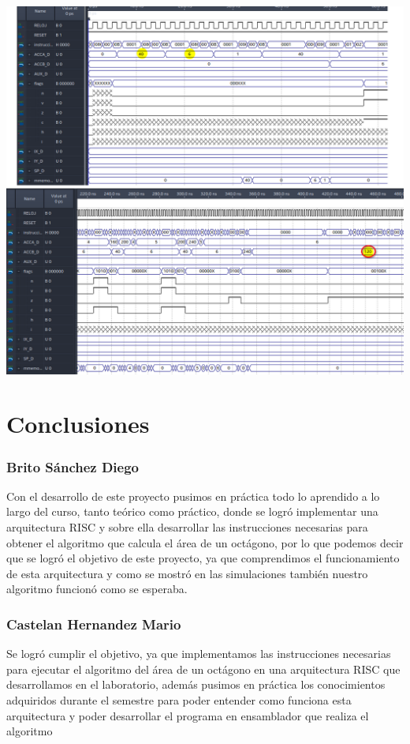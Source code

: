 \documentclass{IEEEtran}
\begin{document}
\begin{center}
\includegraphics[width=.9\linewidth]{./img/40x6.png}
\end{center}
\section{Conclusiones}
\label{sec:org841a61c}
\subsubsection{Brito Sánchez Diego}
\label{sec:orgc0e360c}
Con el desarrollo de este proyecto pusimos en práctica todo lo aprendido a lo largo del curso, tanto teórico como práctico, donde se logró implementar una arquitectura RISC y sobre ella desarrollar las instrucciones necesarias para obtener el algoritmo que calcula el área de un octágono, por lo que podemos decir que se logró el objetivo de este proyecto, ya que comprendimos el funcionamiento de esta arquitectura y como se mostró en las simulaciones también nuestro algoritmo funcionó como se esperaba.

\subsubsection{Castelan Hernandez Mario}
\label{sec:org73439e4}
Se logró cumplir el objetivo, ya que implementamos las instrucciones necesarias para ejecutar el algoritmo del área de un octágono en una arquitectura RISC que desarrollamos en el laboratorio, además pusimos en práctica los conocimientos adquiridos durante el semestre para poder entender como funciona esta arquitectura y poder desarrollar el programa en ensamblador que realiza el algoritmo
\end{document}
